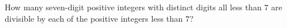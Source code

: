 How many seven-digit positive integers with distinct digits all less than $7$ are divisible by each of the positive integers less than $7$?
